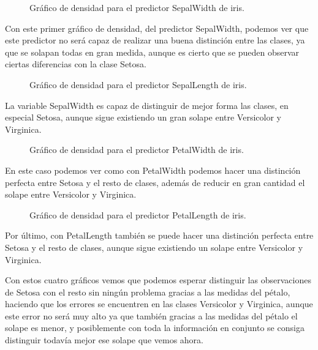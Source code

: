 \begin{figure}[H]
	\centering
	
	\caption{Gráfico de densidad para el predictor SepalWidth de iris.}
	\label{fig:densidad_iris_SepalWidth}
\end{figure}

Con este primer gráfico de densidad, del predictor SepalWidth, podemos ver que este predictor no será capaz de realizar una buena distinción entre las clases, ya que se solapan todas en gran medida, aunque es cierto que se pueden observar ciertas diferencias con la clase Setosa.

\begin{figure}[H]
	\centering
	
	\caption{Gráfico de densidad para el predictor SepalLength de iris.}
	\label{fig:densidad_iris_SepalLength}
\end{figure}

La variable SepalWidth es capaz de distinguir de mejor forma las clases, en especial Setosa, aunque sigue existiendo un gran solape entre Versicolor y Virginica.

\begin{figure}[H]
	\centering
	
	\caption{Gráfico de densidad para el predictor PetalWidth de iris.}
	\label{fig:densidad_iris_PetalWidth}
\end{figure}

En este caso podemos ver como con PetalWidth podemos hacer una distinción perfecta entre Setosa y el resto de clases, además de reducir en gran cantidad el solape entre Versicolor y Virginica.

\begin{figure}[H]
	\centering
	
	\caption{Gráfico de densidad para el predictor PetalLength de iris.}
	\label{fig:densidad_iris_PetalLength}
\end{figure}

Por último, con PetalLength también se puede hacer una distinción perfecta entre Setosa y el resto de clases, aunque sigue existiendo un solape entre Versicolor y Virginica.

Con estos cuatro gráficos vemos que podemos esperar distinguir las observaciones de Setosa con el resto sin ningún problema gracias a las medidas del pétalo, haciendo que los errores se encuentren en las clases Versicolor y Virginica, aunque este error no será muy alto ya que también gracias a las medidas del pétalo el solape es menor, y posiblemente con toda la información en conjunto se consiga distinguir todavía mejor ese solape que vemos ahora.


